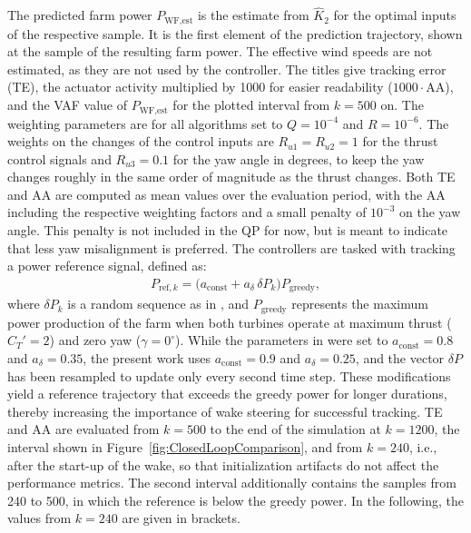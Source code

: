 The predicted farm power $P_{\text{WF,est}}$ is the estimate from $\hat{K}_2$ for the optimal inputs of the respective sample. It is the first element of the prediction trajectory, shown at the sample of the resulting farm power. The effective wind speeds are not estimated, as they are not used by the controller. The titles give tracking error (TE), the actuator activity multiplied by 1000 for easier readability ($1000\cdot$AA), and the VAF value of $P_{\text{WF,est}}$ for the plotted interval from $k = 500$ on. The weighting parameters are for all algorithms set to $Q = 10^{-4}$ and $R = 10^{-6}$. The weights on the changes of the control inputs are $R_{u1} = R_{u2} = 1$ for the thrust control signals and $R_{u3} = 0.1$ for the yaw angle in degrees, to keep the yaw changes roughly in the same order of magnitude as the thrust changes. Both TE and AA are computed as mean values over the evaluation period, with the AA including the respective weighting factors and a small penalty of $10^{-3}$ on the yaw angle. This penalty is not included in the QP for now, but is meant to indicate that less yaw misalignment is preferred.
%
The controllers are tasked with tracking a power reference signal, defined as:
\begin{align*}
    P_{\text{ref},k} = \big(a_{\text{const}} + a_{\delta} \, \delta P_k \big) P_{\text{greedy}},
\end{align*}
where $\delta P_k$ is a random sequence as in \cite{sharan2022Koopman}, and $P_{\text{greedy}}$ represents the maximum power production of the farm when both turbines operate at maximum thrust ($C_T' = 2$) and zero yaw ($\gamma = 0^\circ$). While the parameters in \cite{sharan2022Koopman} were set to $a_{\text{const}} = 0.8$ and $a_{\delta} = 0.35$, the present work uses $a_{\text{const}} = 0.9$ and $a_{\delta} = 0.25$, and the vector $\delta P$ has been resampled to update only every second time step. These modifications yield a reference trajectory that exceeds the greedy power for longer durations, thereby increasing the importance of wake steering for successful tracking. TE and AA are evaluated from $k = 500$ to the end of the simulation at $k = 1200$, the interval shown in Figure~\ref{fig:ClosedLoopComparison}, and from $k = 240$, i.e., after the start-up of the wake, so that initialization artifacts do not affect the performance metrics. The second interval additionally contains the samples from 240 to 500, in which the reference is below the greedy power. In the following, the values from $k = 240$ are given in brackets.

